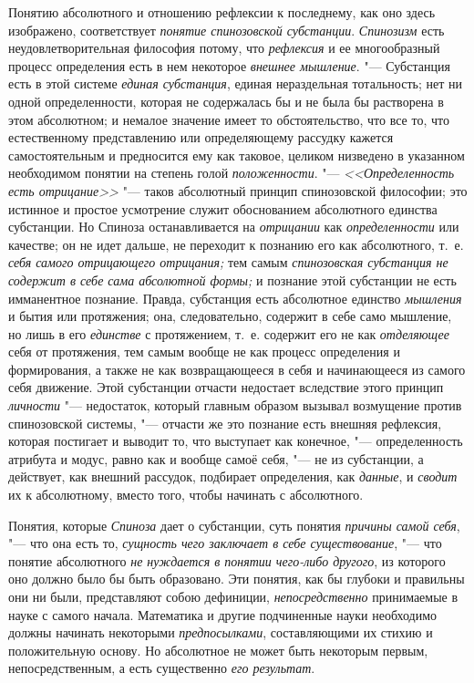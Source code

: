 Понятию абсолютного и отношению рефлексии к последнему, как оно здесь
изображено, соответствует {\em понятие спинозовской
субстанции}. {\em Спинозизм} есть неудовлетворительная
философия потому, что {\em рефлексия} и ее
многообразный процесс определения есть в нем некоторое
{\em внешнее мышление}. "--- Субстанция есть в этой
системе {\em единая субстанция}, единая нераздельная
тотальность; нет ни одной определенности, которая не содержалась бы и не
была бы растворена в этом абсолютном; и немалое значение имеет то
обстоятельство, что все то, что естественному представлению или
определяющему рассудку кажется самостоятельным и предносится ему как
таковое, целиком низведено в указанном необходимом понятии на степень голой
{\em положенности}. "--- {\em <<Определенность есть отрицание>>} "--- таков
абсолютный принцип спинозовской
философии;
это истинное и простое усмотрение служит обоснованием абсолютного единства
субстанции. Но Спиноза останавливается на {\em отрицании} как
{\em определенности} или качестве; он не идет дальше,
не переходит к познанию его как абсолютного, т.~е.
{\em себя самого отрицающего отрицания;} тем самым
{\em спинозовская субстанция не содержит в себе сама
абсолютной формы;} и познание этой субстанции не есть имманентное познание.
Правда, субстанция есть абсолютное единство
{\em мышления} и бытия или протяжения; она,
следовательно, содержит в себе само мышление, но лишь в его
{\em единстве} с протяжением, т.~е. содержит его не как
{\em отделяющее} себя от протяжения, тем самым вообще
не как процесс определения и формирования, а также не как возвращающееся в
себя и начинающееся из самого себя движение. Этой субстанции отчасти
недостает вследствие этого принцип {\em личности}
"--- недостаток, который главным образом вызывал возмущение против
спинозовской системы, "--- отчасти же это познание есть внешняя рефлексия,
которая постигает и выводит то, что выступает как конечное, "---
определенность атрибута и модус, равно как и вообще самоё себя, "--- не из
субстанции, а действует, как внешний рассудок, подбирает определения, как
{\em данные}, и {\em сводит} их к
абсолютному, вместо того, чтобы начинать с абсолютного.

Понятия, которые {\em Спиноза} дает о субстанции, суть
понятия {\em причины самой себя}, "--- что она есть то,
{\em сущность чего заключает в себе существование}, "---
что понятие абсолютного {\em не нуждается в понятии
чего-либо другого}, из которого оно должно было бы быть образовано. Эти
понятия, как бы глубоки и правильны они ни были, представляют собою
дефиниции, {\em непосредственно} принимаемые в науке с
самого начала. Математика и другие подчиненные науки необходимо должны
начинать некоторыми {\em предпосылками}, составляющими
их стихию и положительную основу. Но абсолютное не может быть некоторым
первым, непосредственным, а есть существенно {\em его
результат}.

